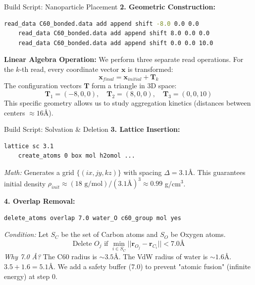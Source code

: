\documentclass[aspectratio=169, 10pt]{beamer}
\begin{document}
\begin{frame}[fragile]{Build Script: Nanoparticle Placement}
    \textbf{2. Geometric Construction:}
    \begin{lstlisting}[language=bash]
    read_data C60_bonded.data add append shift -8.0 0.0 0.0
    read_data C60_bonded.data add append shift 8.0 0.0 0.0
    read_data C60_bonded.data add append shift 0.0 0.0 10.0
    \end{lstlisting}

    \textbf{Linear Algebra Operation:}
    We perform three separate read operations. For the $k$-th read, every coordinate vector $\mathbf{x}$ is transformed:
    \begin{equation}
        \mathbf{x}_{final} = \mathbf{x}_{initial} + \mathbf{T}_k
    \end{equation}
    The configuration vectors $\mathbf{T}$ form a triangle in 3D space:
    \[ \mathbf{T}_1 = (-8,0,0), \quad \mathbf{T}_2 = (8,0,0), \quad \mathbf{T}_3 = (0,0,10) \]
    This specific geometry allows us to study aggregation kinetics (distances between centers $\approx 16$\AA).
\end{frame}

\begin{frame}[fragile]{Build Script: Solvation \& Deletion}
    \textbf{3. Lattice Insertion:}
    \begin{lstlisting}[language=bash]
    lattice sc 3.1
    create_atoms 0 box mol h2omol ...
    \end{lstlisting}
    \textit{Math:} Generates a grid $\{ (ix, jy, kz) \}$ with spacing $\Delta = 3.1$\AA. This guarantees initial density $\rho_{init} \approx (18 \text{ g/mol}) / (3.1 \text{\AA})^3 \approx 0.99$ g/cm$^3$.

    \vspace{0.3cm}
    \textbf{4. Overlap Removal:}
    \begin{lstlisting}[language=bash]
    delete_atoms overlap 7.0 water_O c60_group mol yes
    \end{lstlisting}
    \textit{Condition:}
    Let $S_C$ be the set of Carbon atoms and $S_O$ be Oxygen atoms.
    \begin{equation}
        \text{Delete } O_j \text{ if } \min_{i \in S_C} ||\mathbf{r}_{O_j} - \mathbf{r}_{C_i}|| < 7.0 \text{\AA}
    \end{equation}
    \textit{Why 7.0 \AA?} The C60 radius is $\sim 3.5$\AA. The VdW radius of water is $\sim 1.6$\AA. $3.5 + 1.6 = 5.1$\AA. We add a safety buffer ($7.0$) to prevent "atomic fusion" (infinite energy) at step 0.
\end{frame}
\end{document}

